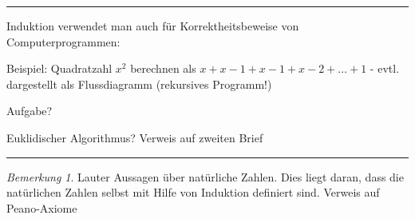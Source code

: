 \documentclass[a4paper,ngerman,12pt]{scrartcl}
\theoremstyle{definition}
\theoremstyle{plain}
\theoremstyle{remark}
\newtheorem{bem}[defn]{Bemerkung}
\begin{document}
\hrule

Induktion verwendet man auch für Korrektheitsbeweise von Computerprogrammen:

Beispiel: Quadratzahl $x^2$ berechnen als $x+x-1 +x-1+x-2 + \dots +1$ - evtl. dargestellt als Flussdiagramm (rekursives Programm!)

Aufgabe?

Euklidischer Algorithmus? Verweis auf zweiten Brief

\hrule

\begin{bem}
Lauter Aussagen über natürliche Zahlen. Dies liegt daran, dass die natürlichen Zahlen selbst mit Hilfe von Induktion definiert sind. Verweis auf Peano-Axiome
\end{bem}
\end{document}
